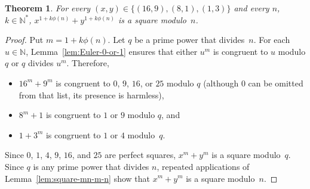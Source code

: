 \documentclass[12pt]{article}
\newcommand{\bZ}{\mathbb{Z}}
\newcommand{\bN}{\mathbb{N}} %
\newcommand{\bNast}{\bN^*}
\newtheorem{theorem}{Theorem}
\theoremstyle{definition}
\begin{document}
   \begin{theorem}
    For every $(x, y) \in \{ (16, 9), (8, 1), (1, 3) \}$ and every $n$, $k \in \bNast$, 
    $x^{1 + k \phi(n)} + y^{1 + k \phi(n)}$ is a square modulo~$n$. 
  \end{theorem}

  \begin{proof}
    Put $m = 1 + k \phi(n)$.
    Let $q$ be a prime power that divides~$n$.
    For each $u \in \bN$, 
    Lemma~\ref{lem:Euler-0-or-1} ensures that either $u^m$ is congruent to $u$ modulo $q$ or $q$ divides $u^m$.
    Therefore, 
    \begin{itemize}
    \item $16^m + 9^m$ is congruent to $0$, $9$, $16$, or $25$ modulo $q$
      (although $0$ can be omitted from that list, its presence is harmless),
      \item $8^m + 1$ is congruent to $1$ or $9$ modulo $q$, and 
      \item $1 + 3^m$ is congruent to $1$ or $4$ modulo~$q$.
      \end{itemize}
      Since $0$, $1$, $4$, $9$, $16$, and $25$ are perfect squares,
      $x^m + y^m$ is a square modulo~$q$.
      Since $q$ is any prime power that divides $n$,
      repeated applications of Lemma~\ref{lem:square-mn-m-n}
      show that $x^m + y^m$ is a square modulo~$n$.
    \end{proof}




\end{document}

